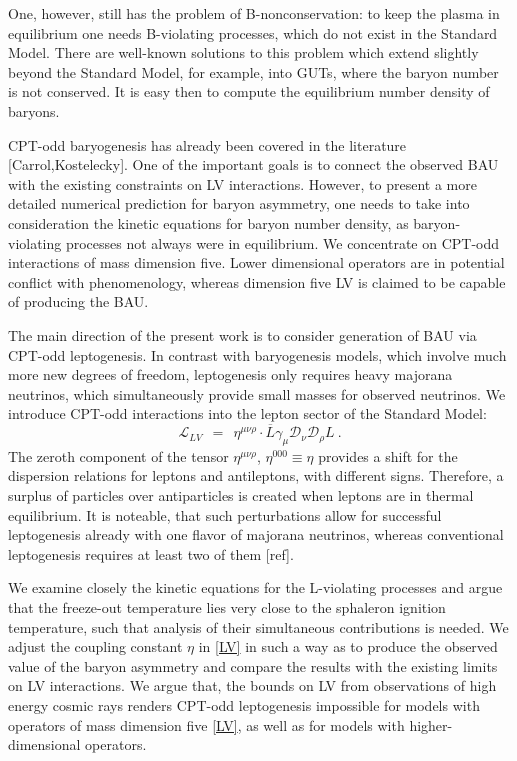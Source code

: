 \documentclass[12pt]{revtex4}
\newcommand{\md}{\mathcal{D}}
\newcommand{\ov}{\overline}
\begin{document}
	One, however, still has the problem of B-nonconservation: to keep the plasma
	in equilibrium one needs B-violating processes, which do not exist in the
	Standard Model.
	There are well-known solutions to this problem which extend slightly beyond
	the Standard Model, for example, into GUTs, where the baryon number is not
	conserved.
	It is easy then to compute the equilibrium number density of baryons.

	CPT-odd baryogenesis has already been covered in the literature [Carrol,Kostelecky].
	One of the important goals is to connect the observed BAU with the existing constraints
	on LV interactions.
	However, to present a more detailed numerical prediction for baryon asymmetry, 
	one needs to take into consideration the kinetic equations for baryon number density,
	as baryon-violating processes not always were in equilibrium.
	We concentrate on CPT-odd interactions of mass dimension five.
	Lower dimensional operators are in potential conflict with phenomenology, whereas
	dimension five LV is claimed to be capable of producing the BAU.
	
	The main direction of the present work is to consider generation of BAU via CPT-odd
	leptogenesis.
	In contrast with baryogenesis models, 
	which involve much more new degrees of freedom, leptogenesis only
	requires heavy majorana neutrinos, which simultaneously provide small
	masses for observed neutrinos.
	We introduce CPT-odd interactions into the lepton sector of the Standard Model:
\begin{equation}
\label{LV}
	\mathcal{L}_{LV} ~~=~~ \eta^{\mu\nu\rho}\cdot \ov{L}\gamma_\mu \md_\nu \md_\rho L~.
\end{equation}
	The zeroth component of the tensor $ \eta^{\mu\nu\rho} $, $ \eta^{000} \equiv \eta $ provides a 
	shift for the dispersion relations for leptons and antileptons, with different signs. 
	Therefore, a surplus of particles over antiparticles is created when leptons are
	in thermal equilibrium.
	It is noteable, that such perturbations allow for successful leptogenesis already
	with one flavor of majorana neutrinos, whereas conventional leptogenesis requires
	at least two of them [ref].
	

	We examine closely the kinetic equations for the L-violating processes and argue that
	the freeze-out temperature lies very close to the sphaleron ignition temperature, such
	that analysis of their simultaneous contributions is needed. 
	We adjust the coupling constant $ \eta $ in \eqref{LV} in such a way as to produce 
	the observed value of the baryon asymmetry and compare the results with the existing
	limits on LV interactions. 
	We argue that, the bounds on LV from observations of high energy cosmic rays renders
	CPT-odd leptogenesis impossible for models with operators of mass dimension five \eqref{LV}, 
	as well as for models with higher-dimensional operators.
	
\end{document}
